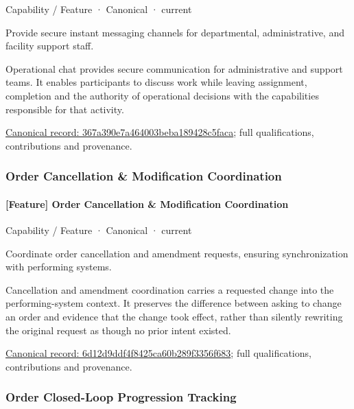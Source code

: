 \label{element:367a390e7a464003beba189428c5faca}
{\small Capability / Feature · Canonical · current}\par

Provide secure instant messaging channels for departmental, administrative, and facility support staff.



Operational chat provides secure communication for administrative and support teams. It enables participants to discuss work while leaving assignment, completion and the authority of operational decisions with the capabilities responsible for that activity.


{\footnotesize \href{../../../../continuum/strategy/capability/feature/367a390e7a464003beba189428c5faca.md}{Canonical record: 367a390e7a464003beba189428c5faca}; full qualifications, contributions and provenance.}\par
\subsubsection{Order Cancellation \& Modification Coordination}

\paragraph{[Feature] Order Cancellation \& Modification Coordination}

\label{element:6d12d9ddf4f8425ca60b289f3356f683}
{\small Capability / Feature · Canonical · current}\par

Coordinate order cancellation and amendment requests, ensuring synchronization with performing systems.



Cancellation and amendment coordination carries a requested change into the performing-system context. It preserves the difference between asking to change an order and evidence that the change took effect, rather than silently rewriting the original request as though no prior intent existed.


{\footnotesize \href{../../../../continuum/strategy/capability/feature/6d12d9ddf4f8425ca60b289f3356f683.md}{Canonical record: 6d12d9ddf4f8425ca60b289f3356f683}; full qualifications, contributions and provenance.}\par
\subsubsection{Order Closed-Loop Progression Tracking}

